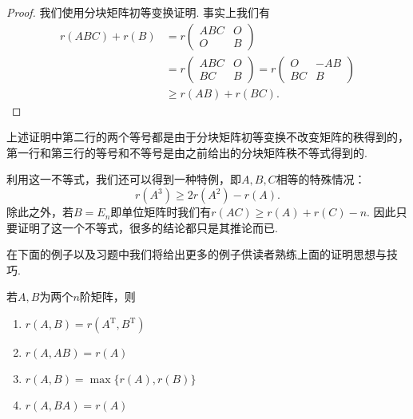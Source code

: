 \begin{enumerate}
          \begin{proof}
              我们使用分块矩阵初等变换证明. 事实上我们有
              \begin{align*}
                  r(ABC)+r(B) & =r\begin{pmatrix}
                                      ABC & O \\ O & B
                                  \end{pmatrix}                 \\
                              & =r\begin{pmatrix}
                                      ABC & O \\ BC & B
                                  \end{pmatrix}=r\begin{pmatrix}
                                                     O & -AB \\ BC & B
                                                 \end{pmatrix} \\
                              & \geqslant r(AB)+r(BC).
              \end{align*}
          \end{proof}

          上述证明中第二行的两个等号都是由于分块矩阵初等变换不改变矩阵的秩得到的，第一行和第三行的等号和不等号是由之前给出的分块矩阵秩不等式得到的.

          利用这一不等式，我们还可以得到一种特例，即$A,B,C$相等的特殊情况：
          \[r(A^3) \geqslant 2r(A^2)-r(A).\]
          除此之外，若$B=E_n$即单位矩阵时我们有$r(AC) \geqslant r(A)+r(C)-n$. 因此只要证明了这一个不等式，很多的结论都只是其推论而已.
\end{enumerate}

在下面的例子以及习题中我们将给出更多的例子供读者熟练上面的证明思想与技巧.
\begin{example}{}{}
    若$A,B$为两个$n$阶矩阵，则
    \begin{enumerate}[label=\Alph*.]
        \item $r(A,B)=r(A^\mathrm{T},B^\mathrm{T})$

        \item $r(A,AB)=r(A)$

        \item $r(A,B)=\max\{r(A), r(B)\}$

        \item $r(A,BA)=r(A)$
    \end{enumerate}
\end{example}

